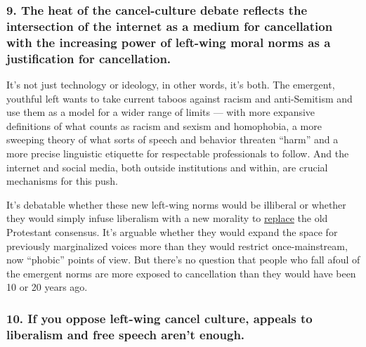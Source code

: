 \hypertarget{9-the-heat-of-the-cancel-culture-debate-reflects-the-intersection-of-the-internet-as-a-medium-for-cancellation-with-the-increasing-power-of-left-wing-moral-norms-as-a-justification-for-cancellation}{%
\subsubsection{9. The heat of the cancel-culture debate reflects the
intersection of the internet as a medium for cancellation with the
increasing power of left-wing moral norms as a justification for
cancellation.}\label{9-the-heat-of-the-cancel-culture-debate-reflects-the-intersection-of-the-internet-as-a-medium-for-cancellation-with-the-increasing-power-of-left-wing-moral-norms-as-a-justification-for-cancellation}}

It's not just technology or ideology, in other words, it's both. The
emergent, youthful left wants to take current taboos against racism and
anti-Semitism and use them as a model for a wider range of limits ---
with more expansive definitions of what counts as racism and sexism and
homophobia, a more sweeping theory of what sorts of speech and behavior
threaten ``harm'' and a more precise linguistic etiquette for
respectable professionals to follow. And the internet and social media,
both outside institutions and within, are crucial mechanisms for this
push.

It's debatable whether these new left-wing norms would be illiberal or
whether they would simply infuse liberalism with a new morality to
\href{https://www.nytimes3xbfgragh.onion/2020/07/07/opinion/protestant-progressive-reformation.html}{replace}
the old Protestant consensus. It's arguable whether they would expand
the space for previously marginalized voices more than they would
restrict once-mainstream, now ``phobic'' points of view. But there's no
question that people who fall afoul of the emergent norms are more
exposed to cancellation than they would have been 10 or 20 years ago.

\hypertarget{10-if-you-oppose-left-wing-cancel-culture-appeals-to-liberalism-and-free-speech-arent-enough}{%
\subsubsection{10. If you oppose left-wing cancel culture, appeals to
liberalism and free speech aren't
enough.}\label{10-if-you-oppose-left-wing-cancel-culture-appeals-to-liberalism-and-free-speech-arent-enough}}

